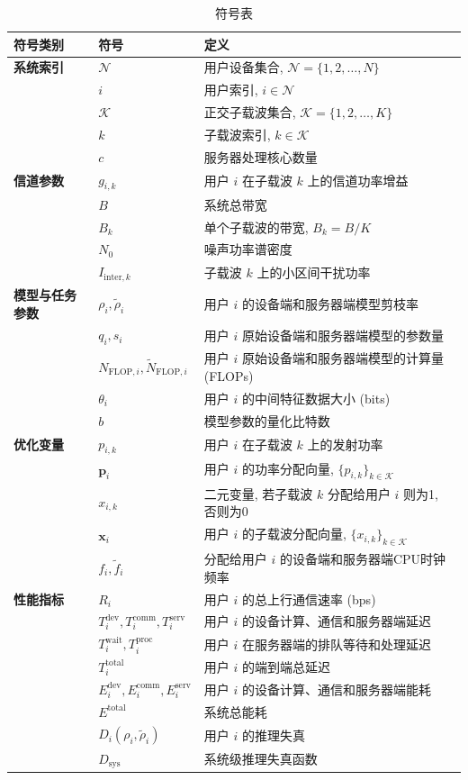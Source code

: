 \documentclass[11pt, a4paper]{article}
\begin{document}
\begin{table}[h!]
\centering
\caption{符号表}
\label{tab:symbols}
\begin{tabular}{lll}
\toprule
\textbf{符号类别} & \textbf{符号} & \textbf{定义} \\
\midrule
\textbf{系统索引} & $\mathcal{N}$ & 用户设备集合, $\mathcal{N} = \{1, 2, \dots, N\}$ \\
& $i$ & 用户索引, $i \in \mathcal{N}$ \\
& $\mathcal{K}$ & 正交子载波集合, $\mathcal{K} = \{1, 2, \dots, K\}$ \\
& $k$ & 子载波索引, $k \in \mathcal{K}$ \\
& $c$ & 服务器处理核心数量 \\
\midrule
\textbf{信道参数} & $g_{i,k}$ & 用户 $i$ 在子载波 $k$ 上的信道功率增益 \\
& $B$ & 系统总带宽 \\
& $B_k$ & 单个子载波的带宽, $B_k = B/K$ \\
& $N_0$ & 噪声功率谱密度 \\
& $I_{\text{inter},k}$ & 子载波 $k$ 上的小区间干扰功率 \\
\midrule
\textbf{模型与任务参数} & $\rho_i, \tilde{\rho}_i$ & 用户 $i$ 的设备端和服务器端模型剪枝率 \\
& $q_i, s_i$ & 用户 $i$ 原始设备端和服务器端模型的参数量 \\
& $N_{\text{FLOP},i}, \tilde{N}_{\text{FLOP},i}$ & 用户 $i$ 原始设备端和服务器端模型的计算量 (FLOPs) \\
& $\theta_i$ & 用户 $i$ 的中间特征数据大小 (bits) \\
& $b$ & 模型参数的量化比特数 \\
\midrule
\textbf{优化变量} & $p_{i,k}$ & 用户 $i$ 在子载波 $k$ 上的发射功率 \\
& $\mathbf{p}_i$ & 用户 $i$ 的功率分配向量, $\{p_{i,k}\}_{k \in \mathcal{K}}$ \\
& $x_{i,k}$ & 二元变量, 若子载波 $k$ 分配给用户 $i$ 则为1, 否则为0 \\
& $\mathbf{x}_i$ & 用户 $i$ 的子载波分配向量, $\{x_{i,k}\}_{k \in \mathcal{K}}$ \\
& $f_i, \tilde{f}_i$ & 分配给用户 $i$ 的设备端和服务器端CPU时钟频率 \\
\midrule
\textbf{性能指标} & $R_i$ & 用户 $i$ 的总上行通信速率 (bps) \\
& $T_i^{\text{dev}}, T_i^{\text{comm}}, T_i^{\text{serv}}$ & 用户 $i$ 的设备计算、通信和服务器端延迟 \\
& $T_i^{\text{wait}}, T_i^{\text{proc}}$ & 用户 $i$ 在服务器端的排队等待和处理延迟 \\
& $T_i^{\text{total}}$ & 用户 $i$ 的端到端总延迟 \\
& $E_i^{\text{dev}}, E_i^{\text{comm}}, E_i^{\text{serv}}$ & 用户 $i$ 的设备计算、通信和服务器端能耗 \\
& $E^{\text{total}}$ & 系统总能耗 \\
& $D_i(\rho_i, \tilde{\rho}_i)$ & 用户 $i$ 的推理失真 \\
& $D_{\text{sys}}$ & 系统级推理失真函数 \\
\bottomrule
\end{tabular}
\end{table}
\end{document}
